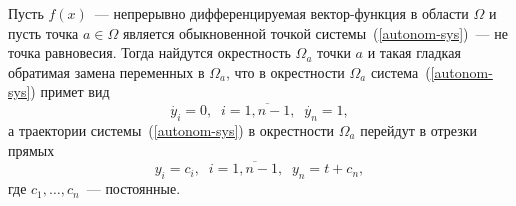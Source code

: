 \begin{theorem}
Пусть $f(x)$~--- непрерывно дифференцируемая вектор-функция в области $\Omega$ и пусть точка $a \in \Omega$ является обыкновенной точкой системы~(\ref{autonom-sys})~--- не точка равновесия. Тогда найдутся окрестность $\Omega_a$ точки $a$ и такая гладкая обратимая замена переменных в $\Omega_a$, что в окрестности $\Omega_a$ система~(\ref{autonom-sys}) примет вид 
\[
\dot{y_i} = 0,\;\; i = \overline{1, n-1},\;\; \dot{y_n} = 1,
\]
а траектории системы~(\ref{autonom-sys}) в окрестности $\Omega_a$ перейдут в отрезки прямых 
\[
y_i = c_i,\;\; i = \overline{1, n-1},\;\; y_n = t + c_n,
\]
где \(c_1, \ldots, c_n\)~--- постоянные.
\end{theorem}